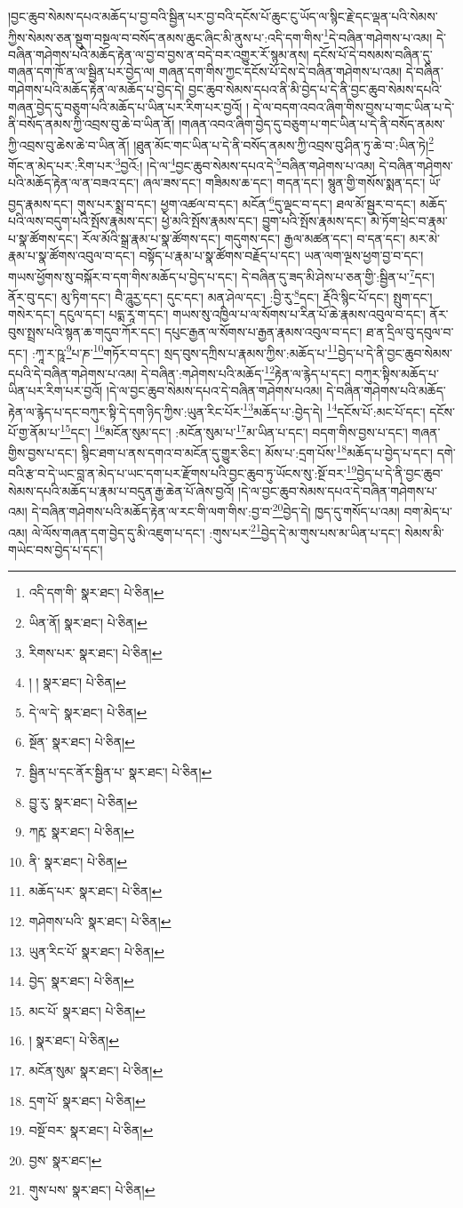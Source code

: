 །བྱང་ཆུབ་སེམས་དཔའ་མཆོད་པ་བྱ་བའི་སྦྱིན་པར་བྱ་བའི་དངོས་པོ་ཆུང་ངུ་ཡོད་ལ་སྙིང་རྗེ་དང་ལྡན་པའི་སེམས་ཀྱིས་སེམས་ཅན་སྡུག་བསྔལ་བ་བསོད་ནམས་ཆུང་ཞིང་མི་ནུས་པ་:འདི་དག་གིས་\footnote{འདི་དག་གི་  སྣར་ཐང་།  པེ་ཅིན། }དེ་བཞིན་གཤེགས་པ་འམ། དེ་བཞིན་གཤེགས་པའི་མཆོད་རྟེན་ལ་བྱ་བ་བྱས་ན་བདེ་བར་འགྱུར་རོ་སྙམ་ནས། དངོས་པོ་དེ་བསམས་བཞིན་དུ་གཞན་དག་ཁོ་ན་ལ་སྦྱིན་པར་བྱེད་ལ། གཞན་དག་གིས་ཀྱང་དངོས་པོ་དེས་དེ་བཞིན་གཤེགས་པ་འམ། དེ་བཞིན་གཤེགས་པའི་མཆོད་རྟེན་ལ་མཆོད་པ་བྱེད་དེ། བྱང་ཆུབ་སེམས་དཔའ་ནི་མི་བྱེད་པ་དེ་ནི་བྱང་ཆུབ་སེམས་དཔའི་གཞན་བྱེད་དུ་བཅུག་པའི་མཆོད་པ་ཡིན་པར་རིག་པར་བྱའོ། །
དེ་ལ་བདག་འབའ་ཞིག་གིས་བྱས་པ་གང་ཡིན་པ་དེ་ནི་བསོད་ནམས་ཀྱི་འབྲས་བུ་ཆེ་བ་ཡིན་ནོ། །གཞན་འབའ་ཞིག་བྱེད་དུ་བཅུག་པ་གང་ཡིན་པ་དེ་ནི་བསོད་ནམས་ཀྱི་འབྲས་བུ་ཆེས་ཆེ་བ་ཡིན་ནོ། །ཐུན་མོང་གང་ཡིན་པ་དེ་ནི་བསོད་ནམས་ཀྱི་འབྲས་བུ་ཤིན་ཏུ་ཆེ་བ་:ཡིན་ཏེ།\footnote{ཡིན་ནོ།  སྣར་ཐང་།  པེ་ཅིན། } གོང་ན་མེད་པར་:རིག་པར་\footnote{རིགས་པར་  སྣར་ཐང་།  པེ་ཅིན། }བྱའོ:། །དེ་ལ་\footnote{། །  སྣར་ཐང་།  པེ་ཅིན། }བྱང་ཆུབ་སེམས་དཔའ་དེ་\footnote{དེ་ལ་དེ་  སྣར་ཐང་།  པེ་ཅིན། }བཞིན་གཤེགས་པ་འམ། དེ་བཞིན་གཤེགས་པའི་མཆོད་རྟེན་ལ་ན་བཟའ་དང་། ཞལ་ཟས་དང་། གཟིམས་ཆ་དང་། གདན་དང་། སྙུན་གྱི་གསོས་སྨན་དང་། ཡོ་བྱད་རྣམས་དང་། གུས་པར་སྨྲ་བ་དང་། ཕྱག་འཚལ་བ་དང་། མངོན་\footnote{སྔོན་  སྣར་ཐང་།  པེ་ཅིན། }དུ་ལྡང་བ་དང་། ཐལ་མོ་སྦྱར་བ་དང་། མཆོད་པའི་ལས་བདུག་པའི་སྤོས་རྣམས་དང་། ཕྱེ་མའི་སྤོས་རྣམས་དང་། བྱུག་པའི་སྤོས་རྣམས་དང་། མེ་ཏོག་ཕྲེང་བ་རྣམ་པ་སྣ་ཚོགས་དང་། རོལ་མོའི་སྒྲ་རྣམ་པ་སྣ་ཚོགས་དང་། གདུགས་དང་། རྒྱལ་མཚན་དང་། བ་དན་དང་། མར་མེ་རྣམ་པ་སྣ་ཚོགས་འབུལ་བ་དང་། བསྟོད་པ་རྣམ་པ་སྣ་ཚོགས་བརྗོད་པ་དང་། ཡན་ལག་ལྔས་ཕྱག་བྱ་བ་དང་། གཡས་ཕྱོགས་སུ་བསྐོར་བ་དག་གིས་མཆོད་པ་བྱེད་པ་དང་། དེ་བཞིན་དུ་ཟད་མི་ཤེས་པ་ཅན་གྱི་:སྦྱིན་པ་\footnote{སྦྱིན་པ་དང་ནོར་སྦྱིན་པ་  སྣར་ཐང་།  པེ་ཅིན། }དང་། ནོར་བུ་དང་། མུ་ཏིག་དང་། བཻ་ཌཱུརྱ་དང་། དུང་དང་། མན་ཤེལ་དང་། :བྱི་རུ་\footnote{བྱུ་རུ་  སྣར་ཐང་།  པེ་ཅིན། }དང་། རྡོའི་སྙིང་པོ་དང་། སྤུག་དང་། གསེར་དང་། དངུལ་དང་། པདྨ་རཱ་ག་དང་། གཡས་སུ་འཁྱིལ་པ་ལ་སོགས་པ་རིན་པོ་ཆེ་རྣམས་འབུལ་བ་དང་། ནོར་བུས་སྤྲས་པའི་སྙན་ཆ་གདུབ་ཀོར་དང་། དཔུང་རྒྱན་ལ་སོགས་པ་རྒྱན་རྣམས་འབུལ་བ་དང་། ཐ་ན་དྲིལ་བུ་དབུལ་བ་དང་། :ཀཱ་ར་ཥཱ་\footnote{ཀརྵ་  སྣར་ཐང་།  པེ་ཅིན། }པ་ཎ་\footnote{ནི་  སྣར་ཐང་།  པེ་ཅིན། }གཏོར་བ་དང་། སྲད་བུས་དཀྲིས་པ་རྣམས་ཀྱིས་:མཆོད་པ་\footnote{མཆོད་པར་  སྣར་ཐང་།  པེ་ཅིན། }བྱེད་པ་དེ་ནི་བྱང་ཆུབ་སེམས་དཔའི་དེ་བཞིན་གཤེགས་པ་འམ། དེ་བཞིན་:གཤེགས་པའི་མཆོད་\footnote{གཤེགས་པའི་  སྣར་ཐང་།  པེ་ཅིན། }རྟེན་ལ་རྙེད་པ་དང་། བཀུར་སྟིས་མཆོད་པ་ཡིན་པར་རིག་པར་བྱའོ། །དེ་ལ་བྱང་ཆུབ་སེམས་དཔའ་དེ་བཞིན་གཤེགས་པའམ། དེ་བཞིན་གཤེགས་པའི་མཆོད་རྟེན་ལ་རྙེད་པ་དང་བཀུར་སྟི་དེ་དག་ཉིད་ཀྱིས་:ཡུན་རིང་པོར་\footnote{ཡུན་རིང་པོ་  སྣར་ཐང་།  པེ་ཅིན། }མཆོད་པ་:བྱེད་དེ། \footnote{བྱེད་  སྣར་ཐང་།  པེ་ཅིན། }དངོས་པོ་:མང་པོ་དང་། དངོས་པོ་གྱ་ནོམ་པ་\footnote{མང་པོ་  སྣར་ཐང་།  པེ་ཅིན། }དང་། \footnote{།    སྣར་ཐང་།  པེ་ཅིན། }མངོན་སུམ་དང་། :མངོན་སུམ་པ་\footnote{མངོན་སུམ་  སྣར་ཐང་།  པེ་ཅིན། }མ་ཡིན་པ་དང་། བདག་གིས་བྱས་པ་དང་། གཞན་གྱིས་བྱས་པ་དང་། སྙིང་ཐག་པ་ནས་དགའ་བ་མངོན་དུ་གྱུར་ཅིང་། མོས་པ་:དྲག་པོས་\footnote{དྲག་པོ་  སྣར་ཐང་།  པེ་ཅིན། }མཆོད་པ་བྱེད་པ་དང་། དགེ་བའི་རྩ་བ་དེ་ཡང་བླ་ན་མེད་པ་ཡང་དག་པར་རྫོགས་པའི་བྱང་ཆུབ་ཏུ་ཡོངས་སུ་:སྔོ་བར་\footnote{བསྔོ་བར་  སྣར་ཐང་།  པེ་ཅིན། }བྱེད་པ་དེ་ནི་བྱང་ཆུབ་སེམས་དཔའི་མཆོད་པ་རྣམ་པ་བདུན་རྒྱ་ཆེན་པོ་ཞེས་བྱའོ། །དེ་ལ་བྱང་ཆུབ་སེམས་དཔའ་དེ་བཞིན་གཤེགས་པ་འམ། དེ་བཞིན་གཤེགས་པའི་མཆོད་རྟེན་ལ་རང་གི་ལག་གིས་:བྱ་བ་\footnote{བྱས་  སྣར་ཐང་། }བྱེད་དེ། ཁྱད་དུ་གསོད་པ་འམ། བག་མེད་པ་འམ། ལེ་ལོས་གཞན་དག་བྱེད་དུ་མི་འཇུག་པ་དང་། :གུས་པར་\footnote{གུས་པས་  སྣར་ཐང་།  པེ་ཅིན། }བྱེད་དེ་མ་གུས་པས་མ་ཡིན་པ་དང་། སེམས་མི་གཡེང་བས་བྱེད་པ་དང་། 